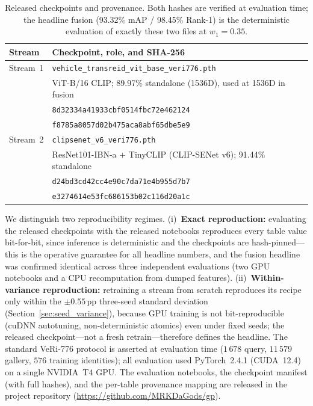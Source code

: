 \documentclass[11pt]{article}
\begin{document}
\begin{table}[!t]
  \centering
  \caption{Released checkpoints and provenance. Both hashes are verified at
    evaluation time; the headline fusion (93.32\% mAP / 98.45\% Rank-1) is the
    deterministic evaluation of exactly these two files at $w_1{=}0.35$.}
  \label{tab:repro}
  \footnotesize
  \begin{tabular}{L{1.4cm}L{6.1cm}}
    \toprule
    Stream & Checkpoint, role, and SHA-256 \\
    \midrule
    Stream~1 & \texttt{vehicle\_transreid\_vit\_base\_veri776.pth} \\
             & ViT-B/16 CLIP; 89.97\% standalone (1536D), used at 1536D in fusion \\
             & {\scriptsize\texttt{8d32334a41933cbf0514fbc72e462124}} \\
             & {\scriptsize\texttt{f8785a8057d02b475aca8abf65dbe5e9}} \\
    \midrule
    Stream~2 & \texttt{clipsenet\_v6\_veri776.pth} \\
             & ResNet101-IBN-a + TinyCLIP (CLIP-SENet v6); 91.44\% standalone \\
             & {\scriptsize\texttt{d24bd3cd42cc4e90c7da71e4b955d7b7}} \\
             & {\scriptsize\texttt{e3274614e53fc686153b02c116d20a1c}} \\
    \bottomrule
  \end{tabular}
\end{table}

We distinguish two reproducibility regimes. (i)~\textbf{Exact reproduction:}
evaluating the released checkpoints with the released notebooks reproduces
every table value bit-for-bit, since inference is deterministic and the
checkpoints are hash-pinned---this is the operative guarantee for all headline
numbers, and the fusion headline was confirmed identical across three
independent evaluations (two GPU notebooks and a CPU recomputation from dumped
features). (ii)~\textbf{Within-variance reproduction:} retraining a stream
from scratch reproduces its recipe only within the $\pm0.55$\,pp three-seed
standard deviation (Section~\ref{sec:seed_variance}), because GPU training is
not bit-reproducible (cuDNN autotuning, non-deterministic atomics) even under
fixed seeds; the released checkpoint---not a fresh retrain---therefore defines
the headline. The standard VeRi-776 protocol is asserted at evaluation time
($1\,678$ query, $11\,579$ gallery, $576$ training identities); all evaluation
used PyTorch~2.4.1 (CUDA~12.4) on a single NVIDIA~T4 GPU. The evaluation
notebooks, the checkpoint manifest (with full hashes), and the per-table
provenance mapping are released in the project repository
(\url{https://github.com/MRKDaGods/gp}).
\end{document}
